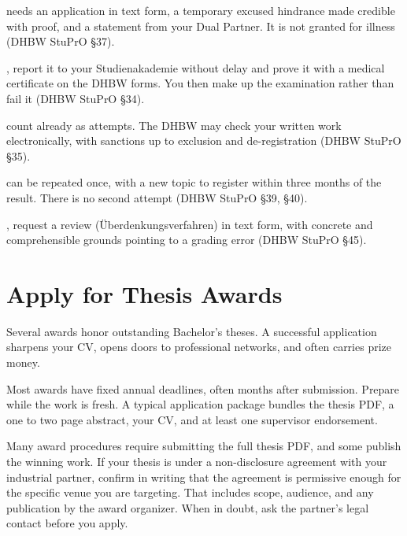 \documentclass{../sharedAssets/tufte}
\begin{document}
 needs an application in text form, a temporary excused hindrance made credible with proof, and a statement from your Dual Partner. It is not granted for illness (DHBW StuPrO \S37).

, report it to your Studienakademie without delay and prove it with a medical certificate on the DHBW forms. You then make up the examination rather than fail it (DHBW StuPrO \S34).

 count already as attempts. The DHBW may check your written work electronically, with sanctions up to exclusion and de-registration (DHBW StuPrO \S35).

 can be repeated once, with a new topic to register within three months of the result. There is no second attempt (DHBW StuPrO \S39, \S40).

, request a review (\"Uberdenkungsverfahren) in text form, with concrete and comprehensible grounds pointing to a grading error (DHBW StuPrO \S45).


\clearpage
\section{Apply for Thesis Awards}
 Several awards honor outstanding Bachelor's theses. A successful application sharpens your CV, opens doors to professional networks, and often carries prize money.

 Most awards have fixed annual deadlines, often months after submission. Prepare while the work is fresh. A typical application package bundles the thesis PDF, a one to two page abstract, your CV, and at least one supervisor endorsement.

 Many award procedures require submitting the full thesis PDF, and some publish the winning work. If your thesis is under a non-disclosure agreement with your industrial partner, confirm in writing that the agreement is permissive enough for the specific venue you are targeting. That includes scope, audience, and any publication by the award organizer. When in doubt, ask the partner's legal contact before you apply.
\end{document}
